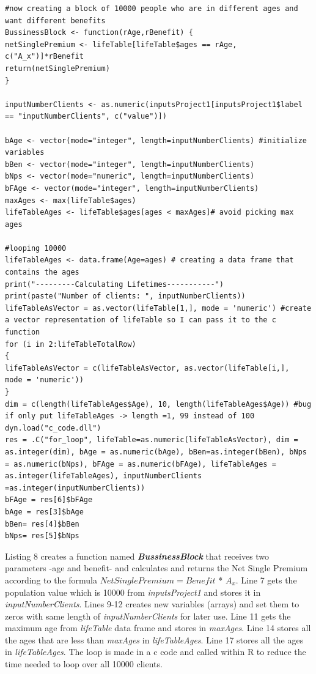 \documentclass[12pt]{article}
\def\StartLineAtOne{\lstset{firstnumber=1}}
\begin{document}

\StartLineAtOne
\begin{lstlisting}[caption={ 10000 Simulation},captionpos=b]
#now creating a block of 10000 people who are in different ages and want different benefits
BussinessBlock <- function(rAge,rBenefit) { 
netSinglePremium <- lifeTable[lifeTable$ages == rAge, c("A_x")]*rBenefit
return(netSinglePremium)
}

inputNumberClients <- as.numeric(inputsProject1[inputsProject1$label == "inputNumberClients", c("value")])

bAge <- vector(mode="integer", length=inputNumberClients) #initialize variables
bBen <- vector(mode="integer", length=inputNumberClients)
bNps <- vector(mode="numeric", length=inputNumberClients)
bFAge <- vector(mode="integer", length=inputNumberClients)
maxAges <- max(lifeTable$ages)
lifeTableAges <- lifeTable$ages[ages < maxAges]# avoid picking max ages

#looping 10000
lifeTableAges <- data.frame(Age=ages) # creating a data frame that contains the ages
print("---------Calculating Lifetimes-----------")
print(paste("Number of clients: ", inputNumberClients))
lifeTableAsVector = as.vector(lifeTable[1,], mode = 'numeric') #create a vector representation of lifeTable so I can pass it to the c function
for (i in 2:lifeTableTotalRow)
{
lifeTableAsVector = c(lifeTableAsVector, as.vector(lifeTable[i,], 
mode = 'numeric'))
}
dim = c(length(lifeTableAges$Age), 10, length(lifeTableAges$Age)) #bug if only put lifeTableAges -> length =1, 99 instead of 100
dyn.load("c_code.dll")
res = .C("for_loop", lifeTable=as.numeric(lifeTableAsVector), dim = as.integer(dim), bAge = as.numeric(bAge), bBen=as.integer(bBen), bNps = as.numeric(bNps), bFAge = as.numeric(bFAge), lifeTableAges = as.integer(lifeTableAges), inputNumberClients =as.integer(inputNumberClients))
bFAge = res[6]$bFAge
bAge = res[3]$bAge
bBen= res[4]$bBen
bNps= res[5]$bNps
\end{lstlisting}

Listing 8 creates a function named \textit{\textbf{BussinessBlock}} that receives two parameters -age and benefit- and calculates  and returns the Net Single Premium according to the formula $Net Single Premium = Benefit$ * $A_{x}$. Line 7 gets the population value which is 10000 from \textit{inputsProject1} and stores it in \textit{inputNumberClients}. Lines 9-12 creates new variables (arrays) and set them to zeros with same length of \textit{inputNumberClients} for later use. Line 11 gets the maximum age from \textit{lifeTable} data frame and stores in \textit{maxAges}. Line 14 stores all the ages that are less than \textit{maxAges} in \textit{lifeTableAges}.  Line 17 stores all the ages in \textit{lifeTableAges}. The loop is made in a c code and called within R to reduce the time needed to loop over all 10000 clients.
\end{document}
